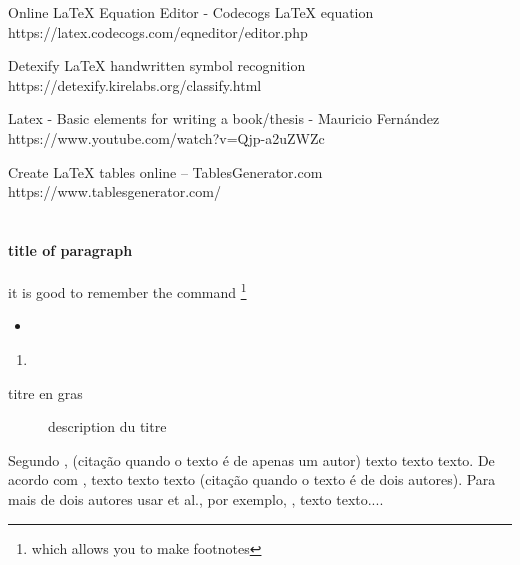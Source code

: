 
Online LaTeX Equation Editor - Codecogs LaTeX equation
https://latex.codecogs.com/eqneditor/editor.php

Detexify LaTeX handwritten symbol recognition
https://detexify.kirelabs.org/classify.html

Latex - Basic elements for writing a book/thesis -  Mauricio Fernández
https://www.youtube.com/watch?v=Qjp-a2uZWZc

Create LaTeX tables online – TablesGenerator.com
https://www.tablesgenerator.com/

%

\section{} 

\subsection{}\label{sec:}

\paragraph{title of paragraph}
it is good to remember the command 
\footnote{which allows you to make footnotes}

\begin{itemize}
    \item 
\end{itemize}

\begin{enumerate}
    \item 
\end{enumerate}

\begin{description}
    \item[titre en gras] description du titre
\end{description}

Segundo \citet{vim2012vocabulario}, (citação quando o texto é de apenas um autor) texto texto texto. De acordo com \citet{balbinot2019instrumentacao}, texto texto texto (citação quando o texto é de dois autores). Para mais de dois autores usar et al., por exemplo, \citet{kleijnen_state---art_2005}, texto texto....

